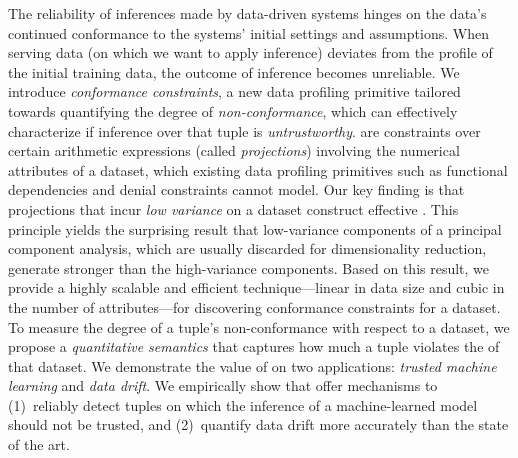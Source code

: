 %
 The reliability of inferences made by data-driven systems hinges
on the data's continued conformance to the systems' initial settings and
assumptions. When serving data (on which we want to apply inference) deviates
from the profile of the initial training data, the outcome of inference becomes
unreliable. 
%
We introduce \emph{conformance constraints}, a new data profiling primitive
tailored towards quantifying the degree of \emph{non-conformance}, which can
effectively characterize if inference over that tuple is \emph{untrustworthy}.
%
\Dis are constraints over certain
arithmetic expressions (called \emph{projections}) involving the numerical
attributes of a dataset, which existing data profiling primitives such as
functional dependencies and denial constraints cannot model.
%
Our key finding is that projections that incur \emph{low variance} on a dataset
construct effective \dis. This principle yields the surprising result that
low-variance components of a principal component analysis, which are usually
discarded for dimensionality reduction, generate stronger \dis than the
high-variance components. Based on this result, we provide a highly scalable
and efficient technique---linear in data size and cubic in the number of
attributes---for discovering conformance constraints for a dataset. To measure
the degree of a tuple's non-conformance with respect to a dataset, we propose a
\emph{quantitative semantics} that captures how much a tuple violates the \dis
of that dataset.
%
We demonstrate the value of \dis on two applications: \emph{trusted machine
learning} and \emph{data drift}. We empirically show that \dis offer mechanisms
to (1)~reliably detect tuples on which the inference of a machine-learned model
should not be trusted, and (2)~quantify data drift more accurately than the
state of the art.